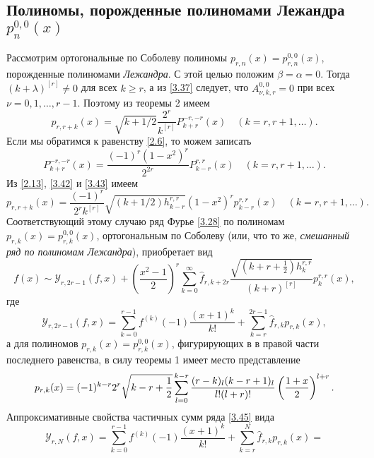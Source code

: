 \subsection{ Полиномы, порожденные полиномами Лежандра $p_{n}^{0,0}(x)$}

 Рассмотрим ортогональные по Соболеву полиномы $p_{r,n}(x)=p_{r,n}^{0,0}(x)$, порожденные полиномами \textit{ Лежандра}. С этой целью положим $\beta=\alpha=0$. Тогда  $(k+\lambda)^{[r]}\neq0$ для всех $k\ge r$, а из \eqref{3.37} следует, что $A_{\nu,k,r}^{0,0}=0$ при всех  $\nu=0,1,\dots, r-1$. Поэтому из теоремы 2 имеем
\begin{equation}\label{3.42}
p_{r,r+k}(x) =\sqrt{k+1/2}
\frac{2^r}{k^{[r]}}P_{k+r}^{-r,-r}(x) \quad (k=r,r+1,\ldots).
\end{equation}
Если мы обратимся к равенству \eqref{2.6}, то можем записать
\begin{equation}\label{3.43}
P_{k+r}^{-r,-r}(x)= \frac{(-1)^r(1-x^2)^r}{2^{2r}}P_{k-r}^{r,r}(x) \quad (k=r,r+1,\ldots).
\end{equation}
Из \eqref{2.13}, \eqref{3.42} и \eqref{3.43} имеем
\begin{equation}\label{3.44}
p_{r,r+k}(x) =
\frac{(-1)^r}{2^rk^{[r]}}\sqrt{(k+1/2)h_{k-r}^{r,r}}(1-x^2)^rp_{k-r}^{r,r}(x) \quad (k=r,r+1,\ldots).
\end{equation}
Соответствующий этому случаю ряд Фурье \eqref{3.28} по полиномам $p_{r,k}(x)=p_{r,k}^{0,0}(x)$, ортогональным по Соболеву (или, что то же, \textit{ смешанный ряд по полиномам  Лежандра}), приобретает вид
\begin{equation}\label{3.45}
f(x)\sim \mathcal{ Y}_{r,2r-1}(f,x)+\left(\frac{x^2-1}2\right)^r\sum_{k=0}^\infty\hat f_{r,k+2r} \frac{\sqrt{(k+r+\frac12)h_k^{r,r}}}{ (k+r)^{[r]}}p_{k}^{r,r}(x),
\end{equation}
где
\begin{equation*}
 \mathcal{ Y}_{r,2r-1}(f,x)=\sum_{k=0}^{r-1} f^{(k)}(-1)\frac{(x+1)^k}{k!}+\sum_{k=r}^{2r-1} \hat f_{r,k}p_{r,k}(x),
\end{equation*}
а для полиномов $p_{r,k}(x)=p_{r,k}^{0,0}(x)$, фигурирующих в в правой части последнего равенства, в силу теоремы 1 имеет место представление
\begin{equation}\label{3.46}
p_{r,k}(x)=(-1)^{k-r}2^{r}\sqrt{k-r+\frac12}
\sum_{l=0}^{k-r}{(r-k)_l(k-r+1)_l\over l!(l+r)!}
\left({1+x\over 2}\right)^{l+r}.
\end{equation}
Аппроксимативные свойства частичных сумм ряда \eqref{3.45} вида
$$
\mathcal{ Y}_{r,N}(f,x)=\sum_{k=0}^{r-1} f^{(k)}(-1)\frac{(x+1)^k}{k!}+\sum_{k=r}^N \hat f_{r,k}p_{r,k}(x)=
$$
